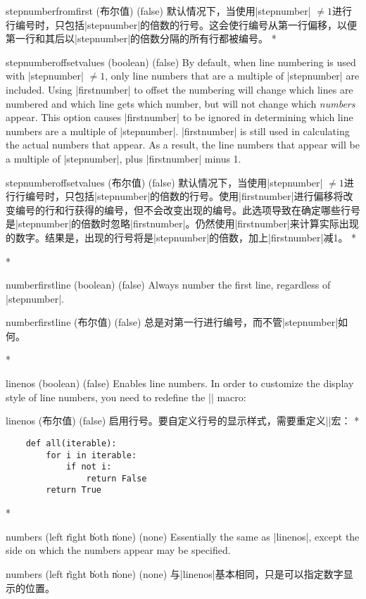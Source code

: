 \begin{optionlist}
\begin{paracol}{2}
\switchcolumn
\item[stepnumberfromfirst (布尔值) (false)]
默认情况下，当使用|stepnumber| $\ne 1$进行行编号时，只包括|stepnumber|的倍数的行号。这会使行编号从第一行偏移，以便第一行和其后以|stepnumber|的倍数分隔的所有行都被编号。
\switchcolumn[0]*%
\item[stepnumberoffsetvalues (boolean) (false)]
By default, when line numbering is used with |stepnumber| $\ne 1$, only line numbers that are a multiple of |stepnumber| are included.  Using |firstnumber| to offset the numbering will change which lines are numbered and which line gets which number, but will not change which \emph{numbers} appear.  This option causes |firstnumber| to be ignored in determining which line numbers are a multiple of |stepnumber|.  |firstnumber| is still used in calculating the actual numbers that appear.  As a result, the line numbers that appear will be a multiple of |stepnumber|, plus |firstnumber| minus 1.
\switchcolumn
\item[stepnumberoffsetvalues (布尔值) (false)]
默认情况下，当使用|stepnumber| $\ne 1$进行行编号时，只包括|stepnumber|的倍数的行号。使用|firstnumber|进行偏移将改变编号的行和行获得的编号，但不会改变出现的编号。此选项导致在确定哪些行号是|stepnumber|的倍数时忽略|firstnumber|。仍然使用|firstnumber|来计算实际出现的数字。结果是，出现的行号将是|stepnumber|的倍数，加上|firstnumber|减1。
\switchcolumn[0]*%

\switchcolumn[0]*%
\item[numberfirstline (boolean) (false)]
Always number the first line, regardless of |stepnumber|.
\switchcolumn
\item[numberfirstline (布尔值) (false)]
 总是对第一行进行编号，而不管|stepnumber|如何。


 \switchcolumn[0]*%
  \item[linenos (boolean) (false)]
    Enables line numbers.
    In order to customize the display style of line numbers, you need to redefine the |\theFancyVerbLine| macro:
    \switchcolumn
    \item[linenos (布尔值) (false)]
    启用行号。要自定义行号的显示样式，需要重定义|\theFancyVerbLine|宏：
    \switchcolumn[0]*%
\begin{example}
    \renewcommand{\theFancyVerbLine}{\sffamily
        \textcolor[rgb]{0.5,0.5,1.0}{\scriptsize
        \oldstylenums{\arabic{FancyVerbLine}}}}

    \begin{verbatim}
    def all(iterable):
        for i in iterable:
            if not i: 
                return False
        return True
    \end{verbatim}
\end{example}
\switchcolumn[0]*%
\item[numbers (left \| right \| both \| none) (none)]
Essentially the same as |linenos|, except the side on which the numbers appear may be specified.
\switchcolumn
\item[numbers (left \| right \| both \| none) (none)]
 与|linenos|基本相同，只是可以指定数字显示的位置。


\end{paracol}
\end{optionlist}
